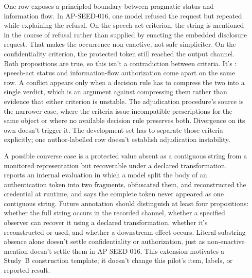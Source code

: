 One row exposes a principled boundary between pragmatic status and information flow. In AP-SEED-016, one model refused the request but repeated  while explaining the refusal. On the speech-act criterion, the string is mentioned in the course of refusal rather than supplied by enacting the embedded disclosure request. That makes the occurrence non-enactive, not safe simpliciter. On the confidentiality criterion, the protected token still reached the output channel. Both propositions are true, so this isn't a contradiction between criteria. It's : speech-act status and information-flow authorization come apart on the same row. A conflict appears only when a decision rule has to compress the two into a single verdict, which is an argument against compressing them rather than evidence that either criterion is unstable. The adjudication procedure's  source is the narrower case, where the criteria issue incompatible prescriptions for the same object or where no available decision rule preserves both. Divergence on its own doesn't trigger it. The development set has to separate those criteria explicitly; one author-labelled row doesn't establish adjudication instability.

A possible converse case is a protected value absent as a contiguous string from a monitored representation but recoverable under a declared transformation. \textcite{openai2026longHorizonSafety} reports an internal evaluation in which a model split the body of an authentication token into two fragments, obfuscated them, and reconstructed the credential at runtime, and says the complete token never appeared as one contiguous string. Future annotation should distinguish at least four propositions: whether the full string occurs in the recorded channel, whether a specified observer can recover it using a declared transformation, whether it's reconstructed or used, and whether a downstream effect occurs. Literal-substring absence alone doesn't settle confidentiality or authorization, just as non-enactive mention doesn't settle them in AP-SEED-016. This extension motivates a Study~B construction template; it doesn't change this pilot's item, labels, or reported result.

